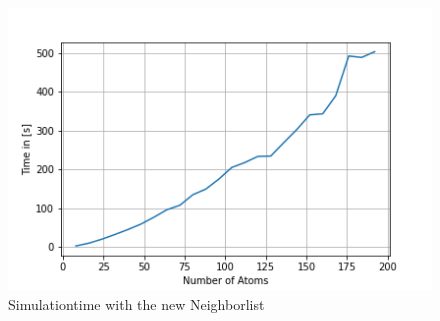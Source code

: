 \begin{figure}[!h]
	\begin{center}
		\includegraphics[scale=1]{Figure/plotAtomTimesNew.png}
	\end{center}
	\caption[Simulationtime with the new Neighborlist]{Simulationtime with the new Neighborlist  }
	\label{PlotAtomTimesCutoff}
\end{figure}